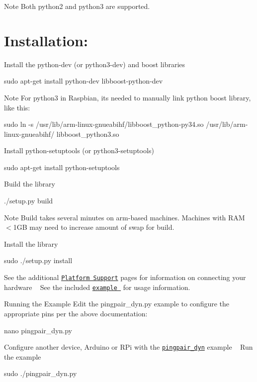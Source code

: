 \begin{DoxyNote}{Note}
Both python2 and python3 are supported.
\end{DoxyNote}
\hypertarget{Python_Install}{}\section{Installation\+:}\label{Python_Install}

\begin{DoxyEnumerate}
\item Install the python-\/dev (or python3-\/dev) and boost libraries 
\begin{DoxyCode}
sudo apt-\textcolor{keyword}{get} install python-dev libboost-python-dev 
\end{DoxyCode}
 \begin{DoxyNote}{Note}
For python3 in Raspbian, it\textquotesingle{}s needed to manually link python boost library, like this\+: 
\begin{DoxyCode}
sudo ln -s /usr/lib/arm-linux-gnueabihf/libboost\_python-py34.so /usr/lib/arm-linux-gnueabihf/
      libboost\_python3.so 
\end{DoxyCode}

\end{DoxyNote}

\item Install python-\/setuptools (or python3-\/setuptools) 
\begin{DoxyCode}
sudo apt-\textcolor{keyword}{get} install python-setuptools 
\end{DoxyCode}

\item Build the library 
\begin{DoxyCode}
./setup.py build   
\end{DoxyCode}
 \begin{DoxyNote}{Note}
Build takes several minutes on arm-\/based machines. Machines with R\+AM $<$1\+GB may need to increase amount of swap for build.
\end{DoxyNote}

\item Install the library 
\begin{DoxyCode}
sudo ./setup.py install  
\end{DoxyCode}
 See the additional \href{pages.html}{\tt Platform Support} pages for information on connecting your hardware ~\newline
 See the included \href{pingpair_dyn_8py-example.html}{\tt example } for usage information.
\item Running the Example Edit the pingpair\+\_\+dyn.\+py example to configure the appropriate pins per the above documentation\+: 
\begin{DoxyCode}
nano pingpair\_dyn.py   
\end{DoxyCode}
 Configure another device, Arduino or R\+Pi with the \href{pingpair_dyn_8py-example.html}{\tt pingpair\+\_\+dyn} example ~\newline
 Run the example 
\begin{DoxyCode}
sudo ./pingpair\_dyn.py  
\end{DoxyCode}

\end{DoxyEnumerate}

~\newline
~\newline
~\newline
 
